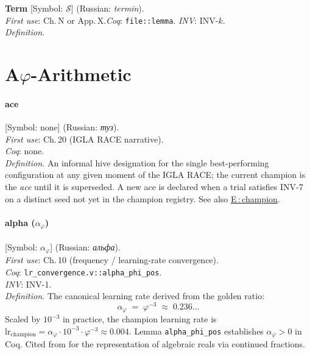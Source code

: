 \medskip
\noindent\textbf{Term} [Symbol: \(\mathcal{S}\)] (Russian: \textit{termin}).\\
\textit{First use}: Ch.\,N or App.\,X.\quad\textit{Coq}: \texttt{file::lemma}.\quad
\textit{INV}: INV-\(k\).\medskip\\
\quad\textit{Definition.}

\bigskip

\section*{A\quad $\varphi$-Arithmetic}
\label{sec:lexicon-phi-arith}

\paragraph*{\textmd{\textbf{ace}}}
\label{entry:ace}
[Symbol: none] (Russian: \textit{туз}).\\
\textit{First use}: Ch.\,20 (IGLA RACE narrative).\\
\textit{Coq}: none.\\
\textit{Definition.}
An informal hive designation for the single best-performing
configuration at any given moment of the IGLA RACE; the current
champion is the \emph{ace} until it is superseded.
A new ace is declared when a trial satisfies INV-7 on a distinct seed
not yet in the champion registry.
See also \hyperref[entry:champion]{E\,:\,champion}.

\paragraph*{\textmd{\textbf{alpha ($\alpha_\varphi$)}}}
\label{entry:alpha-phi}
[Symbol: $\alpha_\varphi$] (Russian: \textit{альфа}).\\
\textit{First use}: Ch.\,10 (frequency / learning-rate convergence).\\
\textit{Coq}: \texttt{lr\_convergence.v::alpha\_phi\_pos}.\\
\textit{INV}: INV-1.\\
\textit{Definition.}
The canonical learning rate derived from the golden ratio:
\[
\alpha_\varphi \;=\; \varphi^{-3} \;\approx\; 0.236\ldots
\]
Scaled by $10^{-3}$ in practice, the champion learning rate is
$\mathrm{lr}_{\mathrm{champion}} = \alpha_\varphi \cdot 10^{-3} \cdot \varphi^{-3}
\approx 0.004$.
Lemma \texttt{alpha\_phi\_pos} establishes $\alpha_\varphi > 0$ in Coq.
Cited from \cite{knuth_concrete_math} for the representation of algebraic
reals via continued fractions.

